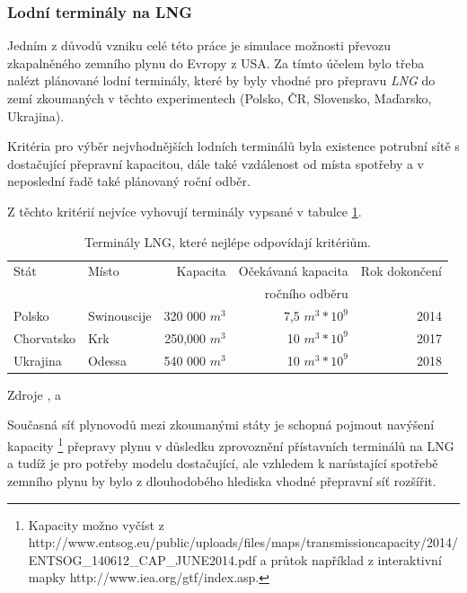 \documentclass[a4paper,11pt]{article}
\begin{document}
\subsubsection{Lodní terminály na LNG}\label{lng}

Jedním z důvodů vzniku celé této práce je simulace možnosti převozu zkapalněného zemního
plynu do Evropy z USA.
Za tímto účelem bylo třeba nalézt plánované lodní terminály, které  by byly vhodné pro
přepravu \textit{LNG} do zemí zkoumaných v těchto experimentech
(Polsko, ČR, Slovensko, Maďarsko, Ukrajina).

Kritéria pro výběr nejvhodnějších lodních terminálů byla existence potrubní sítě s
dostačující přepravní kapacitou, dále také vzdálenost od místa spotřeby a v neposlední
řadě také plánovaný roční odběr.

Z těchto kritérií nejvíce vyhovují terminály vypsané v tabulce \ref{lngtable}.

\begin{table}[h!]
\begin{center}
\begin{tabular}{|l|l|r|r|r|}
    \hline
    Stát		& Místo			& Kapacita 		& Očekávaná kapacita  & Rok dokončení\\
    			&				&				& ročního odběru		&\\
    \hline 
	Polsko		& Swinouscije	& 320 000 $m^3$	& 7,5 $m^3 * 10^9$	& 2014\\
	Chorvatsko 	& Krk			& 250,000 $m^3$	& 10 $m^3 * 10^9$	& 2017\\
	Ukrajina		& Odessa			& 540 000 $m^3$	& 10 $m^3 * 10^9$	& 2018\\
    \hline
\end{tabular}
\caption{Terminály LNG, které nejlépe odpovídají kritériům.}
\label{lngtable}
Zdroje \cite{lngeurope},\cite{lngkrk} a  \cite{lngukrajina}
\end{center}
\end{table}

Současná síť plynovodů mezi zkoumanými státy je schopná pojmout navýšení kapacity
\footnote{Kapacity možno vyčíst z
http://www.entsog.eu/public/uploads/files/maps/transmissioncapacity/2014/\\
ENTSOG{\_}140612{\_}CAP{\_}JUNE2014.pdf
a průtok například z interaktivní mapky http://www.iea.org/gtf/index.asp.}
přepravy plynu v důsledku zprovoznění přístavních terminálů na LNG a tudíž je pro potřeby
modelu dostačující,
ale vzhledem k narůstající spotřebě zemního plynu by bylo z dlouhodobého hlediska vhodné 
přepravní síť rozšířit.
\end{document}
